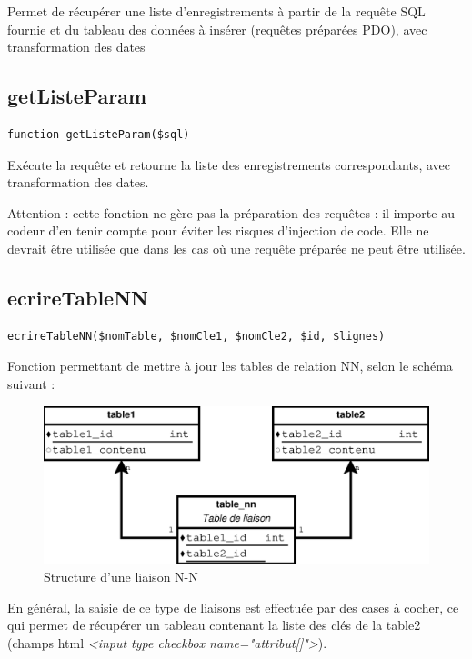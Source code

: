 Permet de récupérer une liste d'enregistrements à partir de la requête SQL fournie et du tableau des données à insérer (requêtes préparées PDO), avec transformation des dates

\subsection{getListeParam}
\begin{lstlisting}
function getListeParam($sql)
\end{lstlisting}

Exécute la requête et retourne la liste des enregistrements correspondants, avec transformation des dates.

Attention : cette fonction ne gère pas la préparation des requêtes : il importe au codeur d'en tenir compte pour éviter les risques d'injection de code. Elle ne devrait être utilisée que dans les cas où une requête préparée ne peut être utilisée.

\subsection{ecrireTableNN}

\begin{lstlisting}
ecrireTableNN($nomTable, $nomCle1, $nomCle2, $id, $lignes)
\end{lstlisting}

Fonction permettant de mettre à jour les tables de relation NN, selon le schéma suivant :

\begin{figure}[H]
\centering
\includegraphics[width=0.8\linewidth]{dessin/schema-nn}
\caption{Structure d'une liaison N-N}
\end{figure}

En général, la saisie de ce type de liaisons est effectuée par des cases à cocher, ce qui permet de récupérer un tableau contenant la liste des clés de la table2 (champs html \textit{<input type checkbox name="attribut[]">}).

